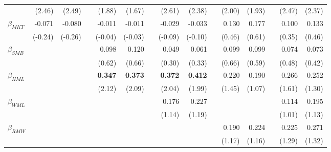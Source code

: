 \begin{singlespacing}
\begin{table}[H]
\begin{tabular}{lrrrrrrrrrrrrrr}
      & (2.46)         & (2.49)         &           & (1.88)         & (1.67)         &           & (2.61)         & (2.38)         &  & (2.00)         & (1.93)         &  & (2.47)          & (2.37)         \\
$\beta_{MKT}$  & -0.071         & -0.080         &           & -0.011         & -0.011         &           & -0.029         & -0.033         &  & 0.130          & 0.177          &  & 0.100           & 0.133          \\
      & (-0.24)        & (-0.26)        &           & (-0.04)        & (-0.03)        &           & (-0.09)        & (-0.10)        &  & (0.46)         & (0.61)         &  & (0.35)          & (0.46)         \\
$\beta_{SMB}$ &                &                &           & 0.098          & 0.120          &           & 0.049          & 0.061          &  & 0.099          & 0.099          &  & 0.074           & 0.073          \\
      &                &                &           & (0.62)         & (0.66)         &           & (0.30)         & (0.33)         &  & (0.66)         & (0.59)         &  & (0.48)          & (0.42)         \\
$\beta_{HML}$  &                &                &           & \textbf{0.347} & \textbf{0.373} & \textbf{} & \textbf{0.372} & \textbf{0.412} &  & 0.220          & 0.190          &  & 0.266           & 0.252          \\
      &                &                &           & (2.12)         & (2.09)         &           & (2.04)         & (1.99)         &  & (1.45)         & (1.07)         &  & (1.61)          & (1.30)         \\
$\beta_{WML}$  &                &                &           &                &                &           & 0.176         & 0.227          &  &                &                &  & 0.114           & 0.195          \\
      &                &                &           &                &                &           & (1.14)        & (1.19)         &  &                &                &  & (1.01)          & (1.13)         \\
$\beta_{RMW}$ &                &                &           &                &                &           &                &                &  & 0.190          & 0.224          &  & 0.225           & 0.271          \\
      &                &                &           &                &                &           &                &                &  & (1.17)         & (1.16)         &  & (1.29)          & (1.32)         \\

\end{tabular}
\end{table}
\end{singlespacing}
